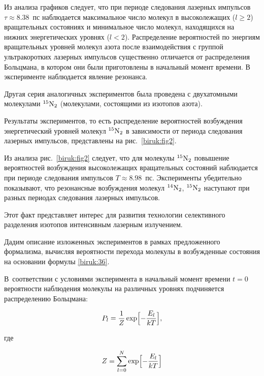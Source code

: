Из анализа графиков следует, что при периоде следования лазерных импульсов $\tau \approx 8.38$~пс наблюдается максимальное число молекул в высоколежащих ($l \geq 2$) вращательных состояниях и минимальное число молекул, находящихся на нижних энергетических уровнях ($l < 2$). Распределение вероятностей по энергиям вращательных уровней молекул азота после взаимодействия с группой ультракоротких лазерных импульсов существенно отличается от распределения Больцмана, в котором они были приготовлены в начальный момент времени. В эксперименте наблюдается явление резонанса.



Другая серия аналогичных экспериментов была проведена с двухатомными молекулами $^{15}\rm N_2$ (молекулами, состоящими из изотопов азота). 

Результаты экспериментов, то есть распределение вероятностей возбуждения энергетический уровней молекул $^{15}\rm N_2$ в зависимости от периода следования лазерных импульсов, представлены на рис.~\ref{biruk:fig2}. 

Из анализа рис.~\ref{biruk:fig2} следует, что для молекулы $^{15}\rm N_2$ повышение вероятностей возбуждения высоколежащих вращательных состояний наблюдается при периоде следования импульсов $T \approx 8.98$~пс. Эксперименты убедительно показывают, что резонансные возбуждения молекул $^{14}\rm N_2$, $^{15}\rm N_2$ наступают при разных периодах следования лазерных импульсов. 

Этот факт представляет интерес для развития технологии селективного разделения изотопов интенсивным лазерным излучением.



Дадим описание изложенных экспериментов в рамках предложенного формализма, вычисляя вероятности перехода молекулы в возбужденные состояния на основании формулы \eqref{biruk:36}. 

В~соответствии с условиями эксперимента в начальный момент времени $t=0$  вероятности наблюдения молекулы на различных уровнях подчиняется распределению Больцмана:

\begin{equation}

P_{l}=\frac{1}{Z}\exp\Bigl[-\frac{E_{l}}{kT}\Bigr],

\label{biruk:37}

\end{equation}

где

\begin{equation}

Z=\sum\limits_{l=0}^{N}\exp\Bigl[-\frac{E_{l}}{kT}\Bigr]

\label{biruk:38}

\end{equation}


